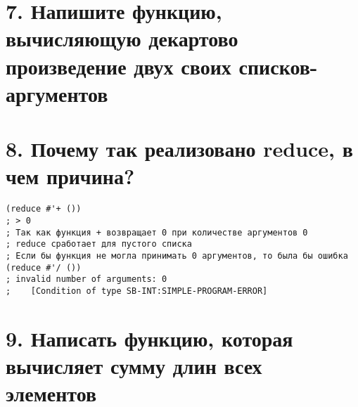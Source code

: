 

\section*{7. Напишите функцию, вычисляющую декартово произведение двух своих списков-аргументов}


	
\section*{8. Почему так реализовано reduce, в чем причина?}
\begin{lstlisting}
(reduce #'+ ())
; > 0
; Так как функция + возвращает 0 при количестве аргументов 0
; reduce сработает для пустого списка
; Если бы функция не могла принимать 0 аргументов, то была бы ошибка
(reduce #'/ ())
; invalid number of arguments: 0
;    [Condition of type SB-INT:SIMPLE-PROGRAM-ERROR]

\end{lstlisting}

\section*{9. Написать функцию, которая вычисляет сумму длин всех элементов}




